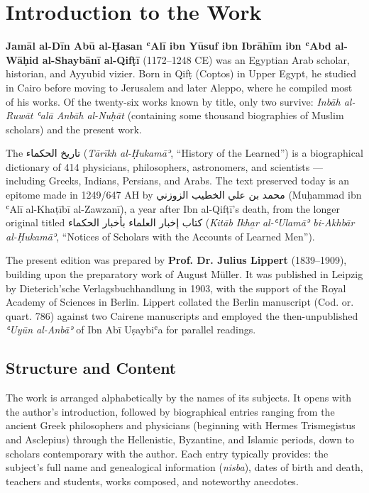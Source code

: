 \documentclass[11pt,a4paper]{article}
\def\RL#1{\beginR#1\endR}
\newcommand{\textgerman}[1]{#1}
\newcommand{\textarabic}[1]{{\arabicfont\RL{#1}}}
\begin{document}
\newpage

\section*{Introduction to the Work}

\textgerman{\textbf{Jamāl al-Dīn Abū al-Ḥasan ʿAlī ibn Yūsuf ibn Ibrāhīm ibn ʿAbd al-Wāḥid al-Shaybānī al-Qifṭī}} (1172--1248 CE) was an Egyptian Arab scholar, historian, and Ayyubid vizier. Born in Qifṭ (Coptos) in Upper Egypt, he studied in Cairo before moving to Jerusalem and later Aleppo, where he compiled most of his works. Of the twenty-six works known by title, only two survive: \textit{Inbāh al-Ruwāt ʿalā Anbāh al-Nuḥāt} (containing some thousand biographies of Muslim scholars) and the present work.

The \textarabic{تاريخ الحكماء} (\textit{Tārīkh al-Ḥukamāʾ}, ``History of the Learned'') is a biographical dictionary of 414 physicians, philosophers, astronomers, and scientists --- including Greeks, Indians, Persians, and Arabs. The text preserved today is an epitome made in 1249/647 AH by \textarabic{محمد بن علي الخطيب الزوزني} (Muḥammad ibn ʿAlī al-Khaṭībī al-Zawzanī), a year after Ibn al-Qifṭī's death, from the longer original titled \textarabic{كتاب إخبار العلماء بأخبار الحكماء} (\textit{Kitāb Ikh\b{a}r al-ʿUlamāʾ bi-Akhbār al-Ḥukamāʾ}, ``Notices of Scholars with the Accounts of Learned Men'').

The present edition was prepared by \textgerman{\textbf{Prof. Dr. Julius Lippert}} (1839--1909), building upon the preparatory work of August Müller. It was published in Leipzig by Dieterich'sche Verlagsbuchhandlung in 1903, with the support of the Royal Academy of Sciences in Berlin. Lippert collated the Berlin manuscript (Cod. or. quart. 786) against two Cairene manuscripts and employed the then-unpublished \textit{ʿUyūn al-Anbāʾ} of Ibn Abī Uṣaybiʿa for parallel readings.

\subsection*{Structure and Content}

The work is arranged alphabetically by the names of its subjects. It opens with the author's introduction, followed by biographical entries ranging from the ancient Greek philosophers and physicians (beginning with Hermes Trismegistus and Asclepius) through the Hellenistic, Byzantine, and Islamic periods, down to scholars contemporary with the author. Each entry typically provides: the subject's full name and genealogical information (\textit{nisba}), dates of birth and death, teachers and students, works composed, and noteworthy anecdotes.
\end{document}
